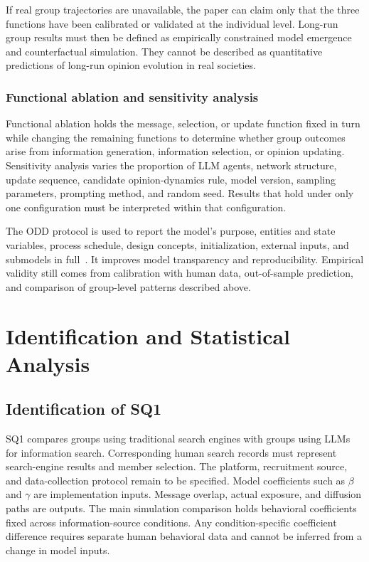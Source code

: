 \documentclass[11pt,a4paper]{article}
\begin{document}
If real group trajectories are unavailable, the paper can claim only that the three functions have been calibrated or validated at the individual level. Long-run group results must then be defined as empirically constrained model emergence and counterfactual simulation. They cannot be described as quantitative predictions of long-run opinion evolution in real societies.

\subsubsection{Functional ablation and sensitivity analysis}

Functional ablation holds the message, selection, or update function fixed in turn while changing the remaining functions to determine whether group outcomes arise from information generation, information selection, or opinion updating. Sensitivity analysis varies the proportion of LLM agents, network structure, update sequence, candidate opinion-dynamics rule, model version, sampling parameters, prompting method, and random seed. Results that hold under only one configuration must be interpreted within that configuration.

The ODD protocol is used to report the model's purpose, entities and state variables, process schedule, design concepts, initialization, external inputs, and submodels in full~\citep{grimm2020}. It improves model transparency and reproducibility. Empirical validity still comes from calibration with human data, out-of-sample prediction, and comparison of group-level patterns described above.

\section{Identification and Statistical Analysis}

\subsection{Identification of SQ1}

SQ1 compares groups using traditional search engines with groups using LLMs for information search. Corresponding human search records must represent search-engine results and member selection. The platform, recruitment source, and data-collection protocol remain to be specified. Model coefficients such as $\beta$ and $\gamma$ are implementation inputs. Message overlap, actual exposure, and diffusion paths are outputs. The main simulation comparison holds behavioral coefficients fixed across information-source conditions. Any condition-specific coefficient difference requires separate human behavioral data and cannot be inferred from a change in model inputs.
\end{document}
